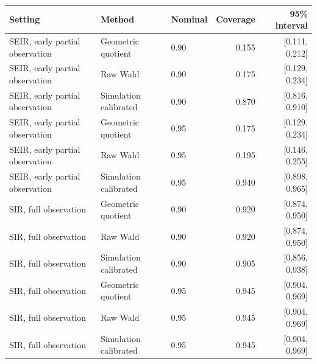 \begin{tabular}{lllrr}
\toprule
Setting & Method & Nominal & Coverage & 95\% interval\\
\midrule
SEIR, early partial observation & Geometric quotient & 0.90 & 0.155 & [0.111, 0.212]\\
SEIR, early partial observation & Raw Wald & 0.90 & 0.175 & [0.129, 0.234]\\
SEIR, early partial observation & Simulation calibrated & 0.90 & 0.870 & [0.816, 0.910]\\
SEIR, early partial observation & Geometric quotient & 0.95 & 0.175 & [0.129, 0.234]\\
SEIR, early partial observation & Raw Wald & 0.95 & 0.195 & [0.146, 0.255]\\
SEIR, early partial observation & Simulation calibrated & 0.95 & 0.940 & [0.898, 0.965]\\
SIR, full observation & Geometric quotient & 0.90 & 0.920 & [0.874, 0.950]\\
SIR, full observation & Raw Wald & 0.90 & 0.920 & [0.874, 0.950]\\
SIR, full observation & Simulation calibrated & 0.90 & 0.905 & [0.856, 0.938]\\
SIR, full observation & Geometric quotient & 0.95 & 0.945 & [0.904, 0.969]\\
SIR, full observation & Raw Wald & 0.95 & 0.945 & [0.904, 0.969]\\
SIR, full observation & Simulation calibrated & 0.95 & 0.945 & [0.904, 0.969]\\
\bottomrule
\end{tabular}
